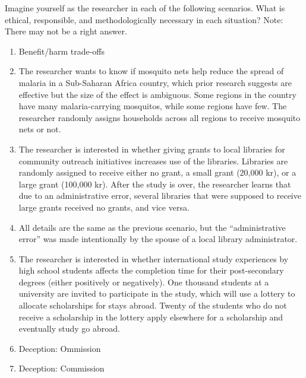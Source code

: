 \documentclass[12pt,a4]{article}
\begin{document}
\thispagestyle{empty}

Imagine yourself as the researcher in each of the following scenarios. What is ethical, responsible, and methodologically necessary in each situation? {Note: There may not be a right answer.}

\begin{enumerate}\itemsep1em

\item Benefit/harm trade-offs

\item The researcher wants to know if mosquito nets help reduce the spread of malaria in a Sub-Saharan Africa country, which prior research suggests are effective but the size of the effect is ambiguous. Some regions in the country have many malaria-carrying mosquitos, while some regions have few. The researcher randomly assigns households across all regions to receive mosquito nets or not. %

\item The researcher is interested in whether giving grants to local libraries for community outreach initiatives increases use of the libraries. Libraries are randomly assigned to receive either no grant, a small grant (20,000 kr), or a large grant (100,000 kr). After the study is over, the researcher learns that due to an administrative error, several libraries that were supposed to receive large grants received no grants, and vice versa.

\item All details are the same as the previous scenario, but the ``administrative error'' was made intentionally by the spouse of a local library administrator.

\item The researcher is interested in whether international study experiences by high school students affects the completion time for their post-secondary degrees (either positively or negatively). One thousand students at a university are invited to participate in the study, which will use a lottery to allocate scholarships for stays abroad. Twenty of the students who do not receive a scholarship in the lottery apply elsewhere for a scholarship and eventually study go abroad.

\item Deception: Ommission

\item Deception: Commission


\end{enumerate}
\end{document}
